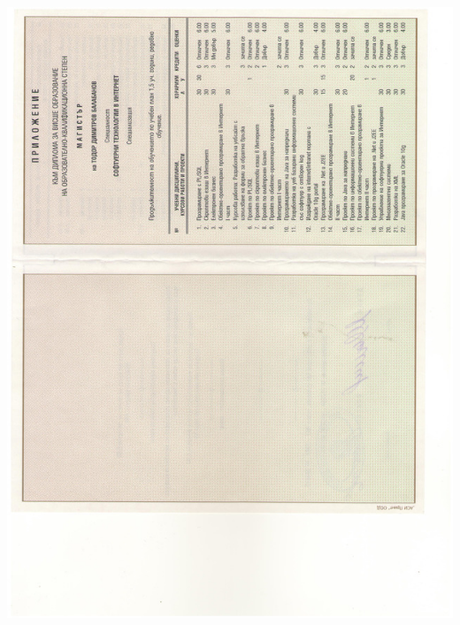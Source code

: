 \documentclass[english,a4paper]{europasscv}
\begin{document}
\includegraphics[width=\textwidth,height=\textheight,keepaspectratio]{DiplomaNBU2008_3}
\end{document}

